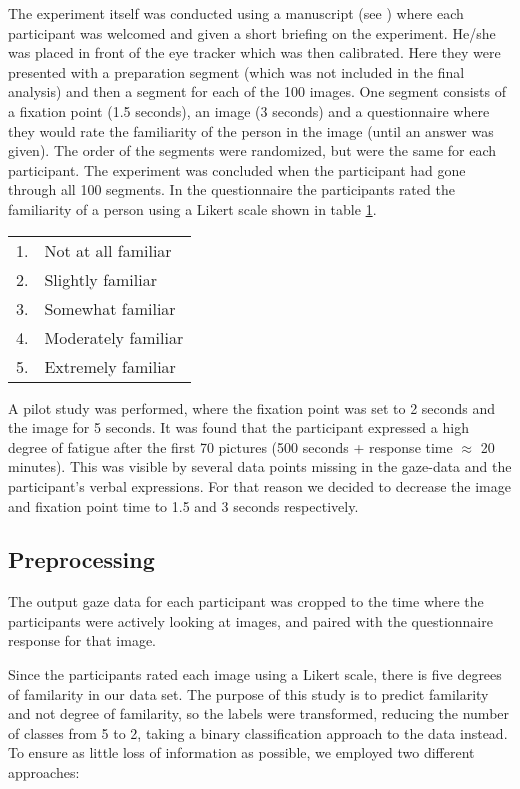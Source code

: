 \documentclass{llncs}
\begin{document}
The experiment itself was conducted using a manuscript (see ) where each participant was welcomed and given a short briefing on the experiment. He/she was placed in front of the eye tracker which was then calibrated. Here they were presented with a preparation segment (which was not included in the final analysis) and then a segment for each of the 100 images. One segment consists of a fixation point (1.5 seconds), an image (3 seconds) and a questionnaire where they would rate the familiarity of the person in the image (until an answer was given). The order of the segments were randomized, but were the same for each participant. The experiment was concluded when the participant had gone through all 100 segments. In the questionnaire the participants rated the familiarity of a person using a Likert scale shown in table \ref{tab:scale}.

\begin{table}[htp]
\label{tab:scale}
\centering
\begin{tabular}{ll}
1. & Not at all familiar \\
2. & Slightly familiar \\
3. & Somewhat familiar \\
4. & Moderately familiar \\
5. & Extremely familiar
\end{tabular}
\end{table}

A pilot study was performed, where the fixation point was set to 2 seconds and the image for 5 seconds. It was found that
the participant expressed a high degree of fatigue after the first 70 pictures (500 seconds + response time $\approx$ 20 minutes).
This was visible by several data points missing in the gaze-data and the participant's verbal expressions.
For that reason we decided to decrease the image and fixation point time to 1.5 and 3 seconds respectively.
\\

\subsection{Preprocessing}
The output gaze data for each participant was cropped to the time where the participants were actively looking at images, and paired 
with the questionnaire response for that image.

Since the participants rated each image using a Likert scale, there is five degrees of familarity in our data set. The purpose of this study is to predict familarity and not degree of familarity, so the labels were transformed, reducing the number of classes from 5 to 2, taking a binary classification approach to the data instead. To ensure as little loss of information as possible, we employed two different approaches: 
\end{document}
